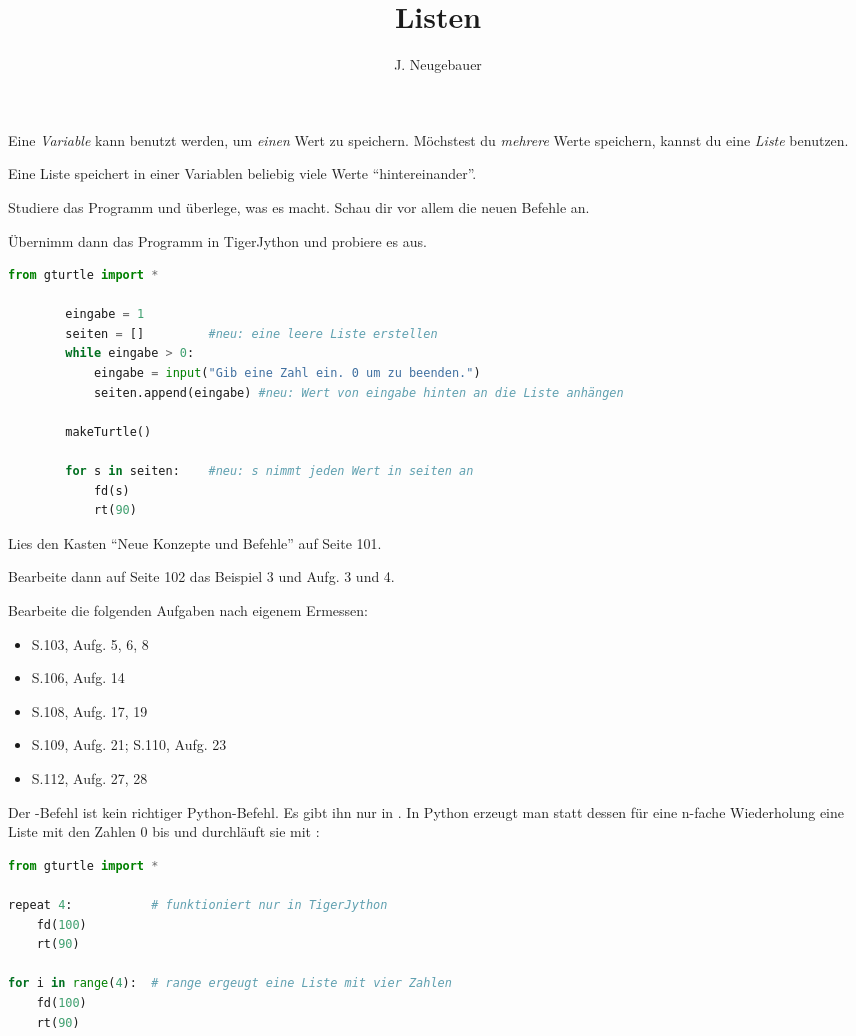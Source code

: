 \documentclass[10pt, a4paper]{scrartcl}
\author{J. Neugebauer}
\title{Listen}
\date{\Heute}
\begin{document}
\ReiheTitel

Eine \emph{Variable} kann benutzt werden, um \emph{einen} Wert zu speichern. Möchstest du \emph{mehrere} Werte speichern, kannst du eine \emph{Liste} benutzen.

Eine Liste speichert in einer Variablen beliebig viele Werte \enquote{hintereinander}.

\begin{aufgabe}
	Studiere das Programm und überlege, was es macht. Schau dir vor allem die neuen Befehle an.
	
	Übernimm dann das Programm in TigerJython und probiere es aus.
	\begin{lstlisting}[language=Python,gobble=8]
		from gturtle import *
		
		eingabe = 1
		seiten = [] 		#neu: eine leere Liste erstellen
		while eingabe > 0:
			eingabe = input("Gib eine Zahl ein. 0 um zu beenden.")
			seiten.append(eingabe) #neu: Wert von eingabe hinten an die Liste anhängen
		
		makeTurtle()
		
		for s in seiten:	#neu: s nimmt jeden Wert in seiten an
			fd(s)
			rt(90)
	\end{lstlisting}
\end{aufgabe}

\begin{aufgabe}
	Lies den Kasten \enquote{Neue Konzepte und Befehle} auf Seite 101.
	
	Bearbeite dann auf Seite 102 das Beispiel 3 und Aufg. 3 und 4.
\end{aufgabe}

\begin{aufgabe}
	Bearbeite die folgenden Aufgaben nach eigenem Ermessen:
	
	\begin{multicols}{2}
	\begin{itemize}
		\item S.103, Aufg. 5, 6, 8 
		\item S.106, Aufg. 14
		\item S.108, Aufg. 17, 19
		\item S.109, Aufg. 21; S.110, Aufg. 23
		\item S.112, Aufg. 27, 28
	\end{itemize}
	\end{multicols}
\end{aufgabe}

\begin{rahmen}\small
Der -Befehl ist kein richtiger Python-Befehl. Es gibt ihn nur in . In Python erzeugt man statt dessen für eine n-fache Wiederholung eine Liste mit den Zahlen 0 bis  und durchläuft sie mit :
\begin{lstlisting}[language=Python]
from gturtle import *

repeat 4:			# funktioniert nur in TigerJython
	fd(100)
	rt(90)

for i in range(4):	# range ergeugt eine Liste mit vier Zahlen
	fd(100)
	rt(90)
\end{lstlisting}
\end{rahmen}
\end{document}
